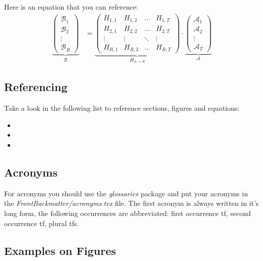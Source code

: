 Here is an equation that you can reference:
\begin{align}
\underbrace{\begin{pmatrix}\mathcal{B}_1\\\mathcal{B}_2\\\vdots\\\mathcal{B}_R\end{pmatrix}}_\mathcal{B} &= \underbrace{\begin{pmatrix}H_{1,1} & H_{1,2} & \hdots & H_{1,T}\\H_{2,1} & H_{2,2} & \hdots & H_{2,T}\\\vdots & \vdots & \ddots & \vdots\\H_{R,1} & H_{R,2} & \hdots & H_{R,T}\end{pmatrix}}_{H_{A\rightarrow B}}\cdot \underbrace{\begin{pmatrix}\mathcal{A}_1\\\mathcal{A}_2\\\vdots\\\mathcal{A}_T\end{pmatrix}}_\mathcal{A}\label{eqn:example}
\end{align}

\subsection{Referencing}

Take a look in the following list to reference sections, figures and equations:
\begin{itemize}
  \item {}
  \item {}
  \item {}
\end{itemize}

\subsection{Acronyms}
For acronyms you should use the \emph{glossaries} package and put your acronyms
in the \emph{FrontBackmatter/acronyms.tex} file. The first acronym is always
written in it's long form, the following occurrences are abbreviated: first
occurrence \gls{tf}, second occurrence \gls{tf}, plural \glspl{tf}.

\subsection{Examples on Figures}

